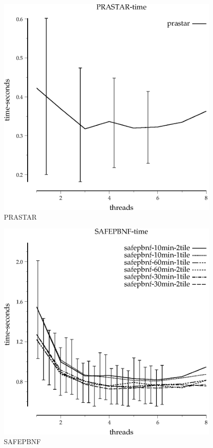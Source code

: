 \documentclass{article}
\begin{document}
\begin{figure}
\begin{center}
\includegraphics{PRASTAR-time}
\end{center}
\caption{PRASTAR}
\end{figure}

\begin{figure}
\begin{center}
\includegraphics{SAFEPBNF-time}
\end{center}
\caption{SAFEPBNF}
\end{figure}
\end{document}
